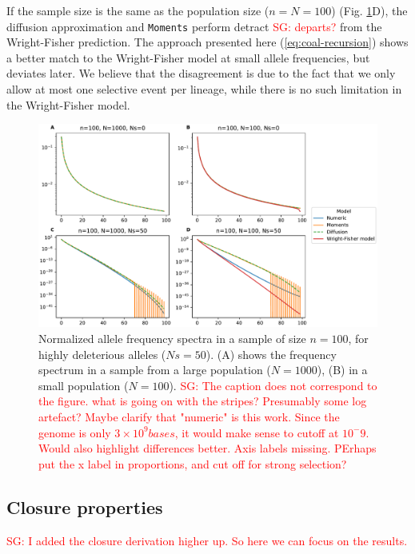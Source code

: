 \documentclass[review]{elsarticle}
\newcommand{\sgcomment}[1]{\textcolor{red}{SG: #1}}
\begin{document}
If the sample size is the same as the population size ($n=N=100$) (Fig.
\ref{fig:strong-selection}D), the diffusion approximation and \texttt{Moments} perform detract \sgcomment{departs?} from
the Wright-Fisher prediction. The approach presented here (\ref{eq:coal-recursion}) shows a better
match to the Wright-Fisher model at small allele frequencies, but deviates later. We believe that
the disagreement is due to the fact that we only allow at most one selective event per lineage,
while there is no such limitation in the Wright-Fisher model.

\begin{figure}
  \centering
  \includegraphics[width=0.7\textheight]{fig/strong_selection_four_panel.pdf}
  \caption{Normalized allele frequency spectra in a sample of size $n=100$, for highly deleterious
    alleles ($Ns=50$). (A) shows the frequency spectrum in a sample from a large population
    ($N=1000$), (B) in a small population ($N=100$). \sgcomment{The caption does not correspond to the figure.
    what is going on with the stripes? Presumably some log artefact? Maybe clarify that "numeric" is this work. Since the genome is only $3\times10^9 bases$, it would make sense to cutoff at $10^-9$. Would also highlight differences better. Axis labels missing. PErhaps put the x label in proportions, and cut off for strong selection?}
    \label{fig:strong-selection}
   }
 
\end{figure}


\subsection{Closure properties}
\label{subsec:closure}

\sgcomment{I added the closure derivation higher up. So here we can focus on the results. }
\end{document}
